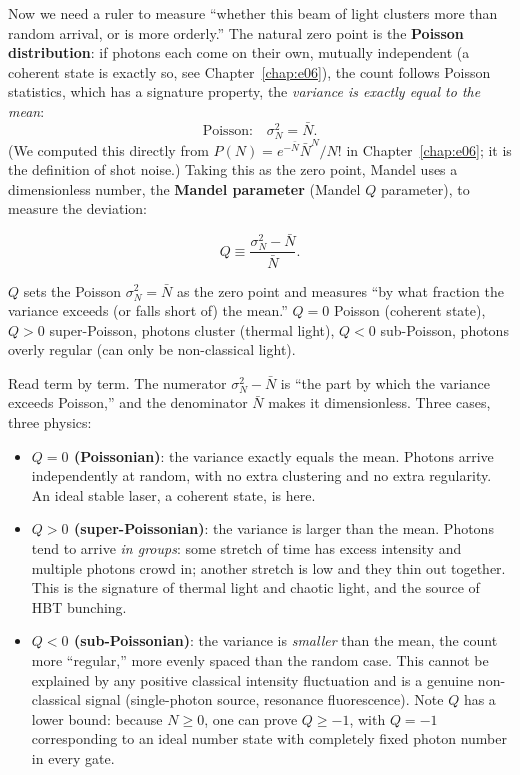 Now we need a ruler to measure ``whether this beam of light clusters more than random arrival, or is more orderly.'' The natural zero point is the \textbf{Poisson distribution}: if photons each come on their own, mutually independent (a coherent state is exactly so, see Chapter~\ref{chap:e06}), the count follows Poisson statistics, which has a signature property, the \emph{variance is exactly equal to the mean}:
\[
  \text{Poisson:}\quad \sigma_N^2=\bar N .
\]
(We computed this directly from \(P(N)=e^{-\bar N}\bar N^N/N!\) in Chapter~\ref{chap:e06}; it is the definition of shot noise.) Taking this as the zero point, Mandel uses a dimensionless number, the \textbf{Mandel parameter} (Mandel \(Q\) parameter), to measure the deviation:

\begin{equation}
  Q\equiv\frac{\sigma_N^2-\bar N}{\bar N}.
  \label{eq:e07-mandel-q}
\end{equation}
\begin{formulaexplain}
\(Q\) sets the Poisson \(\sigma_N^2=\bar N\) as the zero point and measures ``by what fraction the variance exceeds (or falls short of) the mean.'' \(Q=0\) Poisson (coherent state), \(Q>0\) super-Poisson, photons cluster (thermal light), \(Q<0\) sub-Poisson, photons overly regular (can only be non-classical light).
\end{formulaexplain}

Read term by term. The numerator \(\sigma_N^2-\bar N\) is ``the part by which the variance exceeds Poisson,'' and the denominator \(\bar N\) makes it dimensionless. Three cases, three physics:

\begin{itemize}
  \item \textbf{\(Q=0\) (Poissonian)}: the variance exactly equals the mean. Photons arrive independently at random, with no extra clustering and no extra regularity. An ideal stable laser, a coherent state, is here.
  \item \textbf{\(Q>0\) (super-Poissonian)}: the variance is larger than the mean. Photons tend to arrive \emph{in groups}: some stretch of time has excess intensity and multiple photons crowd in; another stretch is low and they thin out together. This is the signature of thermal light and chaotic light, and the source of HBT bunching.
  \item \textbf{\(Q<0\) (sub-Poissonian)}: the variance is \emph{smaller} than the mean, the count more ``regular,'' more evenly spaced than the random case. This cannot be explained by any positive classical intensity fluctuation and is a genuine non-classical signal (single-photon source, resonance fluorescence). Note \(Q\) has a lower bound: because \(N\ge0\), one can prove \(Q\ge-1\), with \(Q=-1\) corresponding to an ideal number state with completely fixed photon number in every gate.
\end{itemize}


